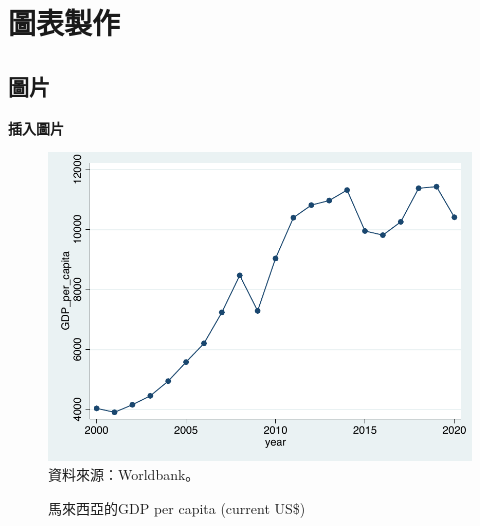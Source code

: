 \documentclass[12pt, aspectratio=169]{beamer}
\begin{document}
\section{圖表製作}


\subsection{圖片}


\linespread{1}  
\begin{frame}{\textbf{插入圖片}}
\linespread{1.5}
	
	\begin{figure}
		\centering %
		\includegraphics[scale=0.45]{Fig/GDP_per_capita.pdf}\\ %
		\hspace{-9em}\scriptsize{資料來源：Worldbank。}\\ %
		\vspace{-0.5em} %
		\caption{馬來西亞的GDP per capita (current US\$)} %
		\label{GDP_per_capita} %
	\end{figure}
	
\end{frame}

\end{document}
